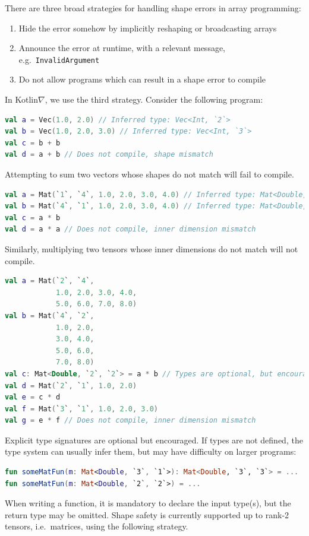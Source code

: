 \documentclass[12pt,initial,twoside,maitrise]{dms}
\numberwithin{equation}{section}
\numberwithin{table}{chapter}
\numberwithin{figure}{chapter}
\begin{document}
\noindent There are three broad strategies for handling shape errors in array programming: \\
%
\begin{enumerate}
    \item Hide the error somehow by implicitly reshaping or broadcasting arrays
    \item Announce the error at runtime, with a relevant message, e.g.\ \texttt{InvalidArgument}
    \item Do not allow programs which can result in a shape error to compile \\
\end{enumerate}
%
In Kotlin$\nabla$, we use the third strategy. Consider the following program:
%
\begin{lstlisting}[language=Kotlin]
val a = Vec(1.0, 2.0) // Inferred type: Vec<Int, `2`>
val b = Vec(1.0, 2.0, 3.0) // Inferred type: Vec<Int, `3`>
val c = b + b
val d = a + b // Does not compile, shape mismatch
\end{lstlisting}
%
Attempting to sum two vectors whose shapes do not match will fail to compile.
%
\begin{lstlisting}[language=Kotlin]
val a = Mat(`1`, `4`, 1.0, 2.0, 3.0, 4.0) // Inferred type: Mat<Double, `1`, `4`>
val b = Mat(`4`, `1`, 1.0, 2.0, 3.0, 4.0) // Inferred type: Mat<Double, `4`, `1`>
val c = a * b
val d = a * a // Does not compile, inner dimension mismatch
\end{lstlisting}
%
Similarly, multiplying two tensors whose inner dimensions do not match will not compile.
%
\begin{lstlisting}[language=Kotlin]
val a = Mat(`2`, `4`,
            1.0, 2.0, 3.0, 4.0,
            5.0, 6.0, 7.0, 8.0)
val b = Mat(`4`, `2`,
            1.0, 2.0,
            3.0, 4.0,
            5.0, 6.0,
            7.0, 8.0)
val c: Mat<Double, `2`, `2`> = a * b // Types are optional, but encouraged
val d = Mat(`2`, `1`, 1.0, 2.0)
val e = c * d
val f = Mat(`3`, `1`, 1.0, 2.0, 3.0)
val g = e * f // Does not compile, inner dimension mismatch
\end{lstlisting}
%
Explicit type signatures are optional but encouraged. If types are not defined, the type system can usually infer them, but may have difficulty on larger programs:
%
\begin{lstlisting}[language=Kotlin]
fun someMatFun(m: Mat<Double, `3`, `1`>): Mat<Double, `3`, `3`> = ...
fun someMatFun(m: Mat<Double, `2`, `2`>) = ...
\end{lstlisting}
%
When writing a function, it is mandatory to declare the input type(s), but the return type may be omitted. Shape safety is currently supported up to rank-2 tensors, i.e.\ matrices, using the following strategy.
\end{document}
